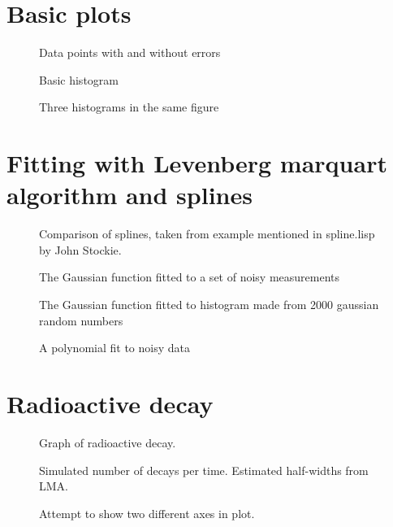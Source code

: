 \documentclass{article}
\begin{document}
\section{Basic plots}
\label{sec:basic}

\begin{figure}[H]
  \centering
  
  \caption{Data points with and without errors}
\end{figure}

\begin{figure}[H]
  \centering
  
  \caption{Basic histogram}
\end{figure}

\begin{figure}[H]
  \centering
  
  \caption{Three histograms in the same figure}
\end{figure}

\section{Fitting with Levenberg marquart algorithm and splines}
\label{sec:LMA}

\begin{figure}[H]
  \centering
  
  \caption{Comparison of splines, taken from example mentioned in spline.lisp by John Stockie.}
\end{figure}

\begin{figure}[H]
  \centering
  
  \caption{The Gaussian function fitted to a set of noisy measurements}
\end{figure}

\begin{figure}[H]
  \centering
  
  \caption{The Gaussian function fitted to histogram made from 2000 gaussian random numbers}
\end{figure}

\begin{figure}[H]
  \centering
  
  \caption{A polynomial fit to noisy data}
\end{figure}

\section{Radioactive decay}
\label{sec:decay}

\begin{figure}[H]
  \centering
  
  \caption{Graph of radioactive decay.}
\end{figure}

\begin{figure}[H]
  \centering
  
  \caption{Simulated number of decays per time.  Estimated half-widths from LMA.}
\end{figure}


\begin{figure}[H]
  \centering
  
  \caption{ Attempt to show two different axes in plot. }
\end{figure}
\end{document}

